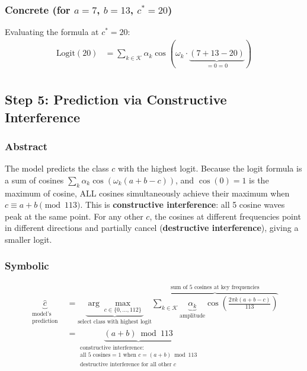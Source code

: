 \documentclass[11pt,a4paper]{article}
\begin{document}
\subsubsection*{Concrete (for $a = 7$, $b = 13$, $c^* = 20$)}

\begin{itemize}
\end{itemize}

Evaluating the formula at $c^* = 20$:
\begin{align*}
    \text{Logit}(20) &= \sum_{k \in \mathcal{K}} \alpha_k \cos\!\left(\omega_k \cdot \underbrace{(7 + 13 - 20)}_{= 0 = 0}\right) \\
\end{align*}

\subsection{Step 5: Prediction via Constructive Interference}

\subsubsection*{Abstract}
The model predicts the class $c$ with the highest logit. Because the logit formula is a sum of cosines $\sum_k \alpha_k \cos(\omega_k(a+b-c))$, and $\cos(0) = 1$ is the maximum of cosine, ALL cosines simultaneously achieve their maximum when $c \equiv a + b \pmod{113}$. This is \textbf{constructive interference}: all 5 cosine waves peak at the same point. For any other $c$, the cosines at different frequencies point in different directions and partially cancel (\textbf{destructive interference}), giving a smaller logit.

\subsubsection*{Symbolic}
\begin{align}
    \underbrace{\hat{c}}_{\substack{\text{model's} \\ \text{prediction}}} &= \underbrace{\arg\max_{c \in \{0,\ldots,112\}}}_{\text{select class with highest logit}} \overbrace{\sum_{k \in \mathcal{K}} \underbrace{\alpha_k}_{\text{amplitude}} \cos\!\left(\frac{2\pi k (a + b - c)}{113}\right)}^{\text{sum of 5 cosines at key frequencies}} \\
    &= \underbrace{(a + b) \bmod 113}_{\substack{\text{constructive interference:} \\\text{all } 5 \text{ cosines} = 1 \text{ when } c = (a+b) \bmod 113 \\\text{destructive interference for all other } c}}
\end{align}
\end{document}
